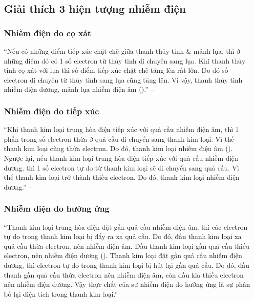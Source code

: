 \documentclass[oneside]{book}
\numberwithin{equation}{section}
\begin{document}
\subsection{Giải thích 3 hiện tượng nhiễm điện}

\subsubsection{Nhiễm điện do cọ xát}
``Nếu có những điểm tiếp xúc chặt chẽ giữa thanh thủy tinh \& mảnh lụa, thì ở những điểm đó có 1 số electron từ thủy tinh di chuyển sang lụa. Khi thanh thủy tinh cọ xát với lụa thì số điểm tiếp xúc chặt chẽ tăng lên rất lớn. Do đó số electron di chuyển từ thủy tinh sang lụa cũng tăng lên. Vì vậy, thanh thủy tinh nhiễm điện dương, mảnh lụa nhiễm điện âm (\cite[Hình 2.3, p. 11]{SGK_Vat_Ly_11_nang_cao}).'' -- \cite[p. 11]{SGK_Vat_Ly_11_nang_cao}

\subsubsection{Nhiễm điện do tiếp xúc}
``Khi thanh kim loại trung hòa điện tiếp xúc với quả cầu nhiễm điện âm, thì 1 phần trong số electron thừa ở quả cầu di chuyển sang thanh kim loại. Vì thế thanh kim loại cũng thừa electron. Do đó, thanh kim loại nhiễm điện âm (\cite[Hình 2.4, p.11]{SGK_Vat_Ly_11_nang_cao}). Ngược lại, nếu thanh kim loại trung hòa điện tiếp xúc với quả cầu nhiễm điện dương, thì 1 số electron tự do từ thanh kim loại sẽ di chuyển sang quả cầu. Vì thế thanh kim loại trở thành thiếu electron. Do đó, thanh kim loại nhiễm điện dương.'' -- \cite[p. 11]{SGK_Vat_Ly_11_nang_cao}

\subsubsection{Nhiễm điện do hưởng ứng}
``Thanh kim loại trung hòa điện đặt gần quả cầu nhiễm điện âm, thì các electron tự do trong thanh kim loại bị đẩy ra xa quả cầu. Do đó, đầu thanh kim loại xa quả cầu thừa electron, nên nhiễm điện âm. Đầu thanh kim loại gần quả cầu thiếu electron, nên nhiễm điện dương (\cite[Hình 2.5, p.11]{SGK_Vat_Ly_11_nang_cao}). Thanh kim loại đặt gần quả cầu nhiễm điện dương, thì electron tự do trong thanh kim loại bị hút lại gần quả cầu. Do đó, đầu thanh gần quả cầu thừa electron nên nhiễm điện âm, còn đầu kia thiếu electron nên nhiễm điện dương. Vậy thực chất của sự nhiễm điện do hưởng ứng là sự phân bố lại điện tích trong thanh kim loại.'' -- \cite[pp. 11--12]{SGK_Vat_Ly_11_nang_cao}
\end{document}

